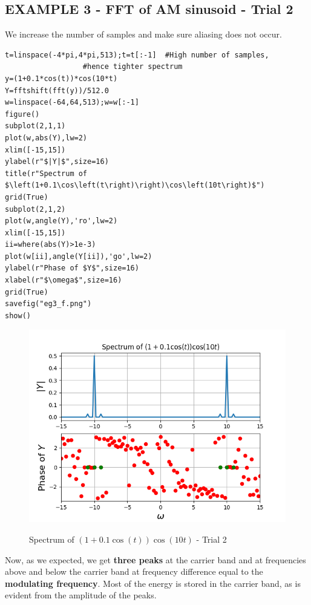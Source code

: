 \documentclass[11pt, a4paper]{article}
\begin{document}
\subsection{EXAMPLE 3 - FFT of AM sinusoid - Trial 2} 
{
We increase the number of samples and make sure aliasing does not occur.
}
\begin{verbatim}
t=linspace(-4*pi,4*pi,513);t=t[:-1]  #High number of samples, 
				  #hence tighter spectrum
y=(1+0.1*cos(t))*cos(10*t)
Y=fftshift(fft(y))/512.0
w=linspace(-64,64,513);w=w[:-1]
figure()
subplot(2,1,1)
plot(w,abs(Y),lw=2)
xlim([-15,15])
ylabel(r"$|Y|$",size=16)
title(r"Spectrum of $\left(1+0.1\cos\left(t\right)\right)\cos\left(10t\right)$")
grid(True)
subplot(2,1,2)
plot(w,angle(Y),'ro',lw=2)
xlim([-15,15])
ii=where(abs(Y)>1e-3)
plot(w[ii],angle(Y[ii]),'go',lw=2)
ylabel(r"Phase of $Y$",size=16)
xlabel(r"$\omega$",size=16)
grid(True)
savefig("eg3_f.png")
show()
\end{verbatim}
\begin{figure}[H]
   	\centering
   	\includegraphics[scale=0.8]{eg3_f.png}
   	\label{fig:eg3_f}
   	\caption{Spectrum of $\left(1+0.1\cos\left(t\right)\right)\cos\left(10t\right)$ - Trial 2}
\end{figure}
{
Now, as we expected, we get \textbf{three peaks} at the carrier band and at frequencies above and below the carrier band at frequency difference equal to the \textbf{modulating frequency}.
Most of the energy is stored in the carrier band, as is evident from the amplitude of the peaks.
}
\end{document}
